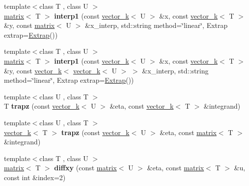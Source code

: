 \begin{DoxyCompactItemize}
\item 
\hypertarget{namespacekeycpp_a50ca6544bccf005c1ac48b21facd349c}{{\footnotesize template$<$class T , class U $>$ }\\\hyperlink{classkeycpp_1_1matrix}{matrix}$<$ T $>$ {\bfseries interp1} (const \hyperlink{classkeycpp_1_1vector__k}{vector\-\_\-k}$<$ U $>$ \&x, const \hyperlink{classkeycpp_1_1vector__k}{vector\-\_\-k}$<$ T $>$ \&y, const \hyperlink{classkeycpp_1_1matrix}{matrix}$<$ U $>$ \&x\-\_\-interp, std\-::string method=\char`\"{}linear\char`\"{}, Extrap extrap=\hyperlink{classkeycpp_1_1_extrap}{Extrap}())}\label{namespacekeycpp_a50ca6544bccf005c1ac48b21facd349c}

\item 
\hypertarget{namespacekeycpp_a7a63750d1400cd9787c78e2f1b8812e0}{{\footnotesize template$<$class T , class U $>$ }\\\hyperlink{classkeycpp_1_1matrix}{matrix}$<$ T $>$ {\bfseries interp1} (const \hyperlink{classkeycpp_1_1vector__k}{vector\-\_\-k}$<$ U $>$ \&x, const \hyperlink{classkeycpp_1_1vector__k}{vector\-\_\-k}$<$ T $>$ \&y, const \hyperlink{classkeycpp_1_1vector__k}{vector\-\_\-k}$<$ \hyperlink{classkeycpp_1_1vector__k}{vector\-\_\-k}$<$ U $>$ $>$ \&x\-\_\-interp, std\-::string method=\char`\"{}linear\char`\"{}, Extrap extrap=\hyperlink{classkeycpp_1_1_extrap}{Extrap}())}\label{namespacekeycpp_a7a63750d1400cd9787c78e2f1b8812e0}

\item 
\hypertarget{namespacekeycpp_a257d22daacd12b862ef18d5405ebf375}{{\footnotesize template$<$class U , class T $>$ }\\T {\bfseries trapz} (const \hyperlink{classkeycpp_1_1vector__k}{vector\-\_\-k}$<$ U $>$ \&eta, const \hyperlink{classkeycpp_1_1vector__k}{vector\-\_\-k}$<$ T $>$ \&integrand)}\label{namespacekeycpp_a257d22daacd12b862ef18d5405ebf375}

\item 
\hypertarget{namespacekeycpp_a2fb57de964e3ede762e18ed0ad165ea1}{{\footnotesize template$<$class U , class T $>$ }\\\hyperlink{classkeycpp_1_1vector__k}{vector\-\_\-k}$<$ T $>$ {\bfseries trapz} (const \hyperlink{classkeycpp_1_1vector__k}{vector\-\_\-k}$<$ U $>$ \&eta, const \hyperlink{classkeycpp_1_1matrix}{matrix}$<$ T $>$ \&integrand)}\label{namespacekeycpp_a2fb57de964e3ede762e18ed0ad165ea1}

\item 
\hypertarget{namespacekeycpp_a7124131346b73357a9e7d8e7c4ae9cc9}{{\footnotesize template$<$class T , class U $>$ }\\\hyperlink{classkeycpp_1_1matrix}{matrix}$<$ T $>$ {\bfseries diffxy} (const \hyperlink{classkeycpp_1_1matrix}{matrix}$<$ U $>$ \&eta, const \hyperlink{classkeycpp_1_1matrix}{matrix}$<$ T $>$ \&u, const int \&index=2)}\label{namespacekeycpp_a7124131346b73357a9e7d8e7c4ae9cc9}


\end{DoxyCompactItemize}
